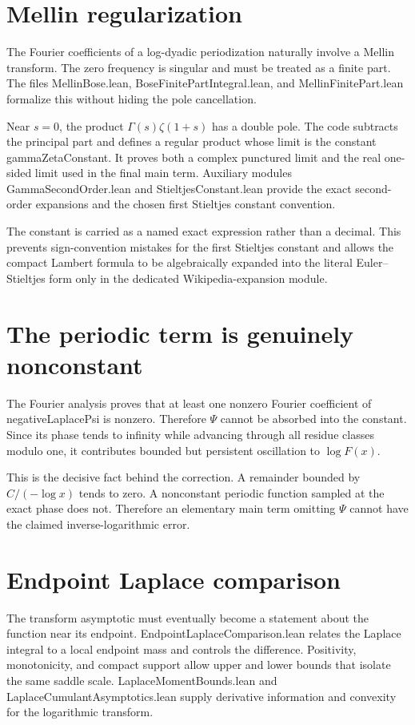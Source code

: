 \documentclass[11pt,a4paper,openany]{book}
\def\module#1{#1.lean}
\def\decl#1{#1}
\newcommand{\module}[1]{\nolinkurl{#1.lean}}
\newcommand{\decl}[1]{\texttt{\detokenize{#1}}}
\begin{document}
\section{Mellin regularization}
The Fourier coefficients of a log-dyadic periodization naturally involve a
Mellin transform.  The zero frequency is singular and must be treated as a
finite part.  The files \module{MellinBose},
\module{BoseFinitePartIntegral}, and \module{MellinFinitePart} formalize this
without hiding the pole cancellation.

Near $s=0$, the product $\Gamma(s)\zeta(1+s)$ has a double pole.  The code
subtracts the principal part and defines a regular product whose limit is the
constant \decl{gammaZetaConstant}.  It proves both a complex punctured limit
and the real one-sided limit used in the final main term.  Auxiliary modules
\module{GammaSecondOrder} and \module{StieltjesConstant} provide the exact
second-order expansions and the chosen first Stieltjes constant convention.

\begin{engineering}
The constant is carried as a named exact expression rather than a decimal.
This prevents sign-convention mistakes for the first Stieltjes constant and
allows the compact Lambert formula to be algebraically expanded into the
literal Euler--Stieltjes form only in the dedicated Wikipedia-expansion module.
\end{engineering}

\section{The periodic term is genuinely nonconstant}
The Fourier analysis proves that at least one nonzero Fourier coefficient of
\decl{negativeLaplacePsi} is nonzero.  Therefore $\Psi$ cannot be absorbed into
the constant.  Since its phase tends to infinity while advancing through all
residue classes modulo one, it contributes bounded but persistent oscillation
to $\log F(x)$.

This is the decisive fact behind the correction.  A remainder bounded by
$C/(-\log x)$ tends to zero.  A nonconstant periodic function sampled at the
exact phase does not.  Therefore an elementary main term omitting $\Psi$ cannot
have the claimed inverse-logarithmic error.

\section{Endpoint Laplace comparison}
The transform asymptotic must eventually become a statement about the function
near its endpoint.  \module{EndpointLaplaceComparison} relates the Laplace
integral to a local endpoint mass and controls the difference.  Positivity,
monotonicity, and compact support allow upper and lower bounds that isolate the
same saddle scale.  \module{LaplaceMomentBounds} and
\module{LaplaceCumulantAsymptotics} supply derivative information and convexity
for the logarithmic transform.
\end{document}
